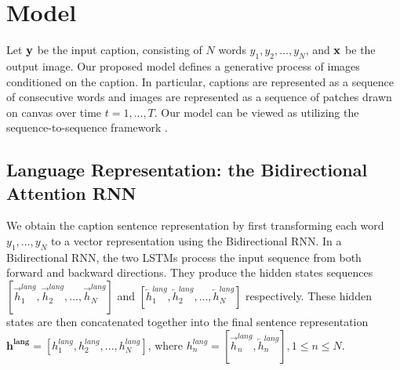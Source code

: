 \documentclass{article} %
\newcommand{\hlang}{h^{lang}}
\newcommand{\hlangall}{\boldsymbol{h^{lang}}}
\newcommand{\icaption}{{\bf{y}}}
\newcommand{\oimage}{{\bf{x}}}
\begin{document}
\vspace{-0.1in}
\section{Model}

Let $\icaption$ be the input caption, consisting of $N$ words $y_{1}, y_{2}, ..., y_{N}$, and $\oimage$ be the output image. Our proposed model 
defines a generative process of images conditioned on the caption. In particular, captions are represented as a sequence of consecutive words and images are represented as a sequence of patches drawn on canvas over time $t=1,...,T$. Our model can be viewed as utilizing the  sequence-to-sequence framework \citep{ilya_mt}.  

\vspace{-0.1in}
\subsection{Language Representation: the Bidirectional Attention RNN}
\label{sec:lang}
We obtain the caption sentence representation by first transforming each word $y_{1},...,y_{N}$ to a vector representation using the Bidirectional RNN. In a Bidirectional RNN, the two LSTMs process the input sequence from both forward and backward directions. They produce the hidden states sequences $[\overrightarrow{h}^{lang}_{1}, \overrightarrow{h}^{lang}_{2}, ..., \overrightarrow{h}^{lang}_{N}]$ and $[\overleftarrow{h}^{lang}_{1}, \overleftarrow{h}^{lang}_{2}, ..., \overleftarrow{h}^{lang}_{N}]$ respectively. These hidden states are then concatenated together into the final sentence representation $\hlangall = [\hlang_{1}, \hlang_{2}, ..., \hlang_{N}]$, where $\hlang_{n} = [\overrightarrow{h}^{lang}_{n}, \overleftarrow{h}^{lang}_{n}], 1\leq n\leq N$.

\vspace{-0.1in}
\end{document}
